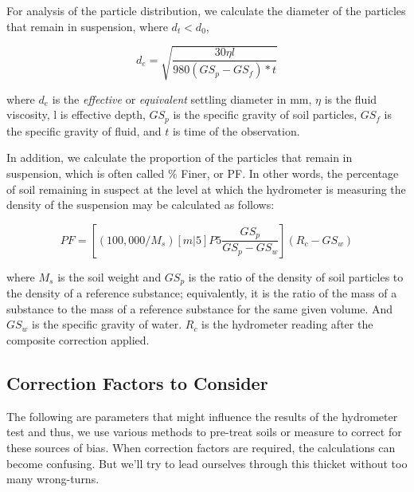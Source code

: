 \documentclass{tufte-handout}
\begin{document}
For analysis of the particle distribution, we calculate the diameter of the particles that remain in suspension, where $d_t < d_0$,  

\begin{equation}
d_e = \sqrt{\frac{30 \eta l}{980 (GS_p - GS_f)* t}}
\end{equation}

\noindent where $d_e$ is the \emph{effective} or \emph{equivalent} settling diameter in mm, 
$\eta$ is the fluid viscosity,
l is effective depth,
$GS_p$ is the specific gravity of soil particles,
$GS_f$ is the specific gravity of fluid, and
$t$ is time of the observation.

In addition, we calculate the proportion of the particles that remain in suspension, which is often called \% Finer, or PF. In other words, the percentage of soil remaining in suspect at the level at which the hydrometer is measuring the density of the suspension may be calculated as follows:

\begin{equation}
PF = [(100,000/M_s)[m|5]P5 \frac{GS_p}{GS_p - GS_w}](R_c - GS_w)
\end{equation}

\noindent where $M_s$ is the soil weight and $GS_p$ is the ratio of the density of soil particles to the density of a reference substance; equivalently, it is the ratio of the mass of a substance to the mass of a reference substance for the same given volume. And $GS_w$ is the specific gravity of water. $R_c$ is the hydrometer reading after the composite correction applied.


\subsection{Correction Factors to Consider}

The following are parameters that might influence the results of the hydrometer test and thus, we use various methods to pre-treat soils or measure to correct for these sources of bias. When correction factors are required, the calculations can become confusing.	 But we'll try to lead ourselves through this thicket without too many wrong-turns. 
\end{document}
